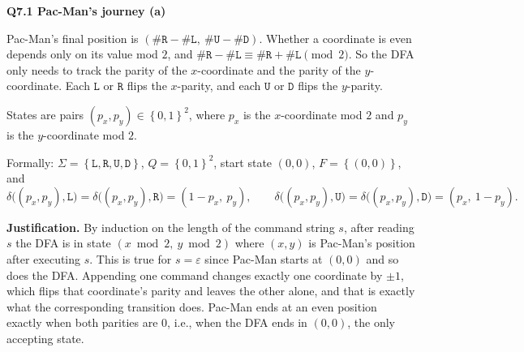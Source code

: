 \documentclass[11pt]{article}
\newcommand{\set}[1]{\left\{#1\right\}}
\newcommand{\qpage}[1]{\clearpage\noindent\textbf{\large #1}\par\medskip}
\begin{document}
\qpage{Q7.1 Pac-Man's journey (a)}

Pac-Man's final position is $(\#\mathtt{R} - \#\mathtt{L},\ \#\mathtt{U} - \#\mathtt{D})$.
Whether a coordinate is even depends only on its value mod $2$, and $\#\mathtt{R} - \#\mathtt{L} \equiv \#\mathtt{R} + \#\mathtt{L} \pmod 2$.
So the DFA only needs to track the parity of the $x$-coordinate and the parity of the $y$-coordinate.
Each $\mathtt{L}$ or $\mathtt{R}$ flips the $x$-parity, and each $\mathtt{U}$ or $\mathtt{D}$ flips the $y$-parity.

States are pairs $(p_x, p_y) \in \set{0,1}^2$, where $p_x$ is the $x$-coordinate mod $2$ and $p_y$ is the $y$-coordinate mod $2$.

\begin{center}
\end{center}

Formally: $\Sigma = \set{\mathtt{L},\mathtt{R},\mathtt{U},\mathtt{D}}$, $Q = \set{0,1}^2$, start state $(0,0)$, $F = \set{(0,0)}$, and
\[
  \delta\big((p_x,p_y), \mathtt{L}\big) = \delta\big((p_x,p_y), \mathtt{R}\big) = (1-p_x,\ p_y), \qquad
  \delta\big((p_x,p_y), \mathtt{U}\big) = \delta\big((p_x,p_y), \mathtt{D}\big) = (p_x,\ 1-p_y).
\]

\textbf{Justification.}
By induction on the length of the command string $s$, after reading $s$ the DFA is in state $(x \bmod 2,\ y \bmod 2)$ where $(x,y)$ is Pac-Man's position after executing $s$.
This is true for $s = \varepsilon$ since Pac-Man starts at $(0,0)$ and so does the DFA.
Appending one command changes exactly one coordinate by $\pm 1$, which flips that coordinate's parity and leaves the other alone, and that is exactly what the corresponding transition does.
Pac-Man ends at an even position exactly when both parities are $0$, i.e., when the DFA ends in $(0,0)$, the only accepting state.
\end{document}

